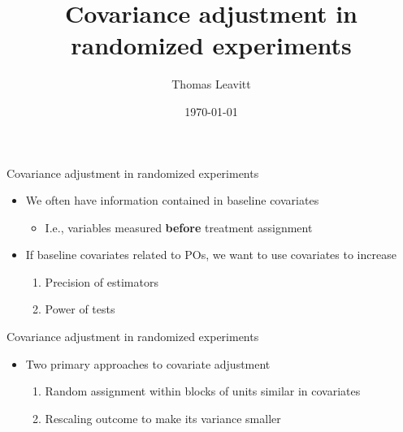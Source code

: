 \documentclass[table, xcolor = {dvipsnames}, 9pt]{beamer}
\title[]{Covariance adjustment in randomized experiments} %
\author{Thomas Leavitt} %
\institute[] %
{
\medskip
\textit{} %
}
\date{\today} %
\theoremstyle{plain}
\begin{document}
\begin{frame}
\titlepage %
\end{frame}


\begin{frame}{Covariance adjustment in randomized experiments}
\vfill
\begin{itemize}
\item We often have information contained in baseline covariates \vfill
\begin{itemize} \vfill
\item I.e., variables measured \textbf{before} treatment assignment  \vfill
\end{itemize} \vfill
\item If baseline covariates related to POs, we want to use covariates to increase\vfill
\begin{enumerate}
\item Precision of estimators \vfill 
\item Power of tests \vfill
\end{enumerate} \vfill
\end{itemize} \vfill
\end{frame}
\begin{frame}{Covariance adjustment in randomized experiments}
\vfill
\begin{itemize}
\item Two primary approaches to covariate adjustment  \vfill
\begin{enumerate} \vfill
\item Random assignment within blocks of units similar in covariates  \vfill
\item Rescaling outcome to make its variance smaller  \vfill
\end{enumerate}  \vfill
\end{itemize} \vfill
\end{frame}
\end{document}
